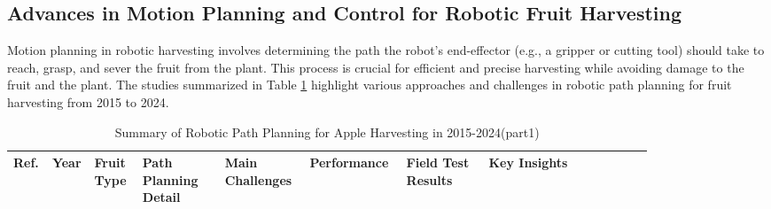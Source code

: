 \documentclass[a4paper,fleqn]{cas-dc}
\begin{document}
\subsection{Advances in Motion Planning and Control for Robotic Fruit Harvesting}
Motion planning in robotic harvesting involves determining the path the robot’s end-effector (e.g., a gripper or cutting tool) should take to reach, grasp, and sever the fruit from the plant. This process is crucial for efficient and precise harvesting while avoiding damage to the fruit and the plant. The studies summarized in Table \ref{tab:path-planning-based} highlight various approaches and challenges in robotic path planning for fruit harvesting from 2015 to 2024.

\begin{table}   
	\centering
	\footnotesize 
	\caption{Summary of Robotic Path Planning for Apple Harvesting in 2015-2024(part1)} 
	\label{tab:path-planning-based}
	\begin{tabular}{p{0.025\linewidth} p{0.025\linewidth} p{0.07\linewidth} p{0.12\linewidth} p{0.12\linewidth} p{0.12\linewidth} p{0.12\linewidth} p{0.24\linewidth}}
\toprule
\textbf{Ref.} & \textbf{Year} & \textbf{Fruit Type} & \textbf{Path Planning Detail} & \textbf{Main Challenges} & \textbf{Performance} & \textbf{Field Test Results} & \textbf{Key Insights} \\ \midrule





\end{tabular}
\end{table}
\end{document}
